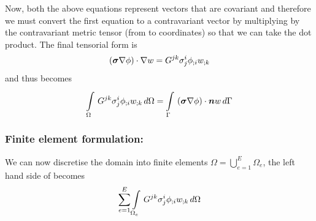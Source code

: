 Now, both the above equations represent vectors that are covariant and
therefore we must convert the first equation to a contravariant vector by 
multiplying by the contravariant metric tensor (from  to  
coordinates) so that we can take the dot product. The final tensorial form is
\begin{equation}
  \left( \boldsymbol{\sigma}\nabla\phi \right)\cdot\nabla w = G^{jk}\sigma^{i}_{j} {\phi}_{;i}  {w}_{;k} 
\end{equation}
and thus  becomes
\begin{equation}
  \gint{\Omega}{}{G^{jk}\sigma^{i}_{j}\covarderiv{\phi}{i}\covarderiv{w}{k}}{\Omega}=
  \gint{\Gamma}{}{\dotprod{\pbrac{\tensor{\sigma}\grad\phi}}{\vect{n}w}}{\Gamma}
  \label{eqn:Laplaceweightedresidualtensorform}
\end{equation}

\subsubsection{Finite element formulation:}
We can now discretise the domain into finite elements \ie $\Omega=
\displaystyle{\bigcup_{e=1}^{E}}\Omega_{e}$, the left hand side of
 becomes
\begin{equation}
  \displaystyle\sum_{e=1}^{E}  \displaystyle\int\limits_{\Omega_{e}}^{} \,G^{jk}\sigma^{i}_{j} {\phi}_{;i}  {w}_{;k} \,d\Omega 
\end{equation}

